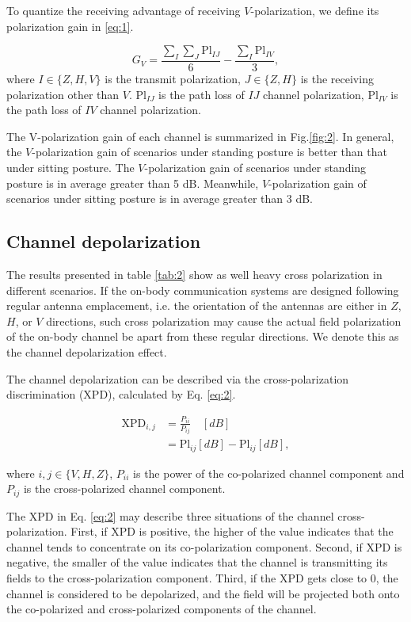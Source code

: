 \documentclass[conference]{IEEEtran}
\begin{document}
To quantize the receiving advantage of receiving $V$-polarization, we define its polarization gain in \ref{eq:1}.

\begin{equation}
	G_{V}=\frac{\sum\limits_I\sum\limits_J\text{Pl}_{IJ}}{6} -\frac{\sum\limits_I{\text{Pl}_{IV}}}{3},
\label{ep:1}
\end{equation}
where $I\in\{Z,H,V\}$ is the transmit polarization, $J\in\{Z,H\}$ is the receiving polarization other than $V$. $\text{Pl}_{IJ}$ is the path loss of $IJ$ channel polarization, $\text{Pl}_{IV}$ is the path loss of $IV$ channel polarization.

The  V-polarization gain of each channel is summarized in Fig.\ref{fig:2}. In general, the $V$-polarization gain of scenarios under standing posture is better than that under sitting posture. The $V$-polarization gain of scenarios under standing posture is in average greater than 5 dB. Meanwhile, $V$-polarization gain of scenarios under sitting posture is in average greater than 3 dB.

\subsection{Channel depolarization}
The results presented in table \ref{tab:2} show as well heavy cross polarization in different scenarios. If the on-body communication systems are designed following regular antenna emplacement, i.e. the orientation of the antennas are either in $Z$, $H$, or $V$ directions, such cross polarization may cause the actual field polarization of the on-body channel be apart from these regular directions. We denote this as the channel depolarization effect. 

The channel depolarization can be described via the cross-polarization discrimination (XPD), calculated by Eq. \ref{eq:2}.

 \begin{align}
	 \text{XPD}_{i,j}&=\frac{P_{ii}}{P_{ij}} \quad[dB]\nonumber\\
	 &=\text{Pl}_{ij}[dB]-\text{Pl}_{ij}[dB], \label{eq:2}
\end{align}

where $i,j \in \{V,H,Z\}$, $P_{ii}$ is the power of the co-polarized channel component and $P_{ij}$ is the cross-polarized channel component.

The XPD in Eq. \ref{eq:2} may describe three situations of the channel cross-polarization. First, if XPD is positive, the higher of the value indicates that the channel tends to concentrate on its co-polarization component. Second, if XPD is negative, the smaller of the value indicates that the channel is transmitting its fields to the cross-polarization component. Third, if the XPD gets close to 0, the channel is considered to be depolarized, and the field will be projected both onto the co-polarized and cross-polarized components of the channel. 
\end{document}
